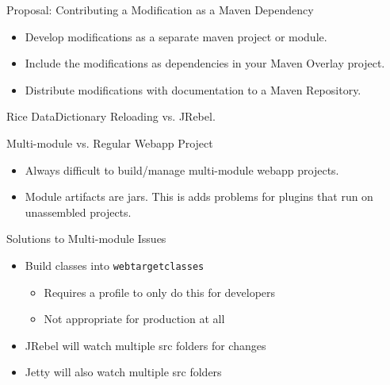 \documentclass[xcolor=dvipsnames,14pt,professionalfonts]{beamer}
\begin{document}
\begin{frame}[fragile]{Proposal: Contributing a Modification as a Maven Dependency}
  \begin{itemize}
    \item Develop modifications as a separate maven project or module.
    \item Include the modifications as dependencies in your Maven Overlay project.
    \item Distribute modifications with documentation to a Maven Repository.
  \end{itemize}
\end{frame}

\begin{frame}[fragile]{Rice DataDictionary Reloading vs. JRebel.}
\end{frame}

\begin{frame}{Multi-module vs. Regular Webapp Project}
  \begin{itemize}
    \item Always difficult to build/manage multi-module webapp
      projects.
    \item Module artifacts are jars. This is adds problems for plugins that run on unassembled projects.
  \end{itemize}
\end{frame}

\begin{frame}{Solutions to Multi-module Issues}
  \begin{itemize}
    \item Build classes into \texttt{web\/target\/classes}
      \begin{itemize}
        \item Requires a profile to only do this for developers
        \item Not appropriate for production at all
      \end{itemize}
    \item JRebel will watch multiple src folders for changes
    \item Jetty will also watch multiple src folders
  \end{itemize}
\end{frame}
\end{document}
